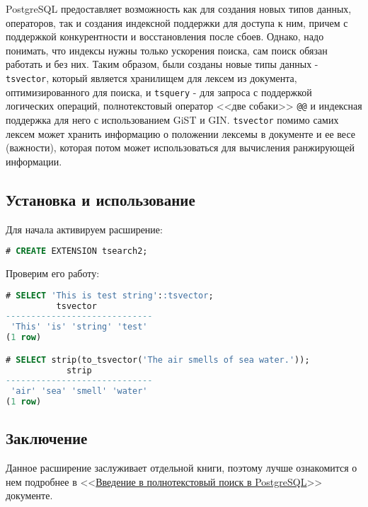 PostgreSQL предоставляет возможность как для создания новых типов данных, операторов, так и создания индексной поддержки для доступа к ним, причем с поддержкой конкурентности и восстановления после сбоев. Однако, надо понимать, что индексы нужны только ускорения поиска, сам поиск обязан работать и без них. Таким образом, были созданы новые типы данных - \lstinline!tsvector!, который является хранилищем для лексем из документа, оптимизированного для поиска, и \lstinline!tsquery! - для запроса с поддержкой логических операций, полнотекстовый оператор <<две собаки>> \lstinline!@@! и индексная поддержка для него с использованием GiST и GIN. \lstinline!tsvector! помимо самих лексем может хранить информацию о положении лексемы в документе и ее весе (важности), которая потом может использоваться для вычисления ранжирующей информации.

\subsection{Установка и использование}

Для начала активируем расширение:

\begin{lstlisting}[language=SQL,label=lst:tsearch1,caption=Активация tsearch2]
# CREATE EXTENSION tsearch2;
\end{lstlisting}

Проверим его работу:

\begin{lstlisting}[language=SQL,label=lst:tsearch2,caption=Проверка tsearch2]
# SELECT 'This is test string'::tsvector;
          tsvector
-----------------------------
 'This' 'is' 'string' 'test'
(1 row)

# SELECT strip(to_tsvector('The air smells of sea water.'));
            strip
-----------------------------
 'air' 'sea' 'smell' 'water'
(1 row)
\end{lstlisting}


\subsection{Заключение}

Данное расширение заслуживает отдельной книги, поэтому лучше ознакомится о нем подробнее в <<\href{http://www.sai.msu.su/~megera/postgres/talks/fts\_pgsql\_intro.html}{Введение в полнотекстовый поиск в PostgreSQL}>> документе.

